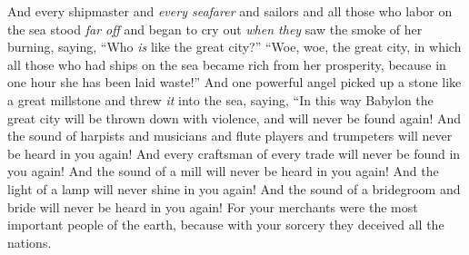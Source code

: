 \begin{biblechapter}
\verse And every shipmaster and \textit{every seafarer} and sailors and all those who labor on the sea stood \textit{far off}
\verse and began to cry out \textit{when they} saw the smoke of her burning, saying, “Who \textit{is} like the great city?”
\verse “Woe, woe, the great city, 
in which all those who had ships on the sea 
became rich from her prosperity, 
because in one hour she has been laid waste!”
\verse And one powerful angel picked up a stone like a great millstone and threw \textit{it} into the sea, saying,
\verse “In this way Babylon the great city will be thrown down with violence, 
and will never be found again!
\verse And the sound of harpists and musicians and flute players and trumpeters 
will never be heard in you again! 
And every craftsman of every trade 
will never be found in you again! 
And the sound of a mill 
will never be heard in you again!
\verse And the light of a lamp 
will never shine in you again! 
And the sound of a bridegroom and bride 
will never be heard in you again! 
For your merchants were the most important people of the earth, 
because with your sorcery they deceived all the nations.
\end{biblechapter}

